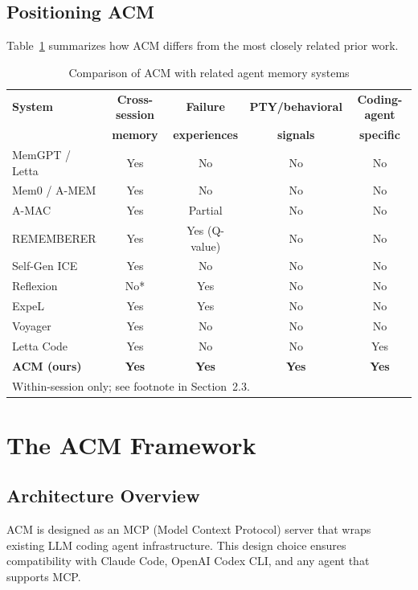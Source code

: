 \documentclass[conference]{IEEEtran}
\begin{document}
\subsection{Positioning ACM}

Table~\ref{tab:comparison} summarizes how ACM differs from the most closely related prior work.

\begin{table}[t]
\centering
\caption{Comparison of ACM with related agent memory systems}
\label{tab:comparison}
\begin{tabular}{lcccc}
\toprule
\textbf{System} & \textbf{Cross-session} & \textbf{Failure} & \textbf{PTY/behavioral} & \textbf{Coding-agent} \\
 & \textbf{memory} & \textbf{experiences} & \textbf{signals} & \textbf{specific} \\
\midrule
MemGPT / Letta & Yes & No & No & No \\
Mem0 / A-MEM & Yes & No & No & No \\
A-MAC & Yes & Partial & No & No \\
REMEMBERER & Yes & Yes (Q-value) & No & No \\
Self-Gen ICE & Yes & No & No & No \\
Reflexion & No* & Yes & No & No \\
ExpeL & Yes & Yes & No & No \\
Voyager & Yes & No & No & No \\
Letta Code & Yes & No & No & Yes \\
\textbf{ACM (ours)} & \textbf{Yes} & \textbf{Yes} & \textbf{Yes} & \textbf{Yes} \\
\bottomrule
\multicolumn{5}{l}{\small *Within-session only; see footnote in Section~2.3.}
\end{tabular}
\end{table}

\section{The ACM Framework}

\subsection{Architecture Overview}

ACM is designed as an MCP (Model Context Protocol) server that wraps existing LLM coding agent infrastructure. This design choice ensures compatibility with Claude Code, OpenAI Codex CLI, and any agent that supports MCP.
\end{document}

